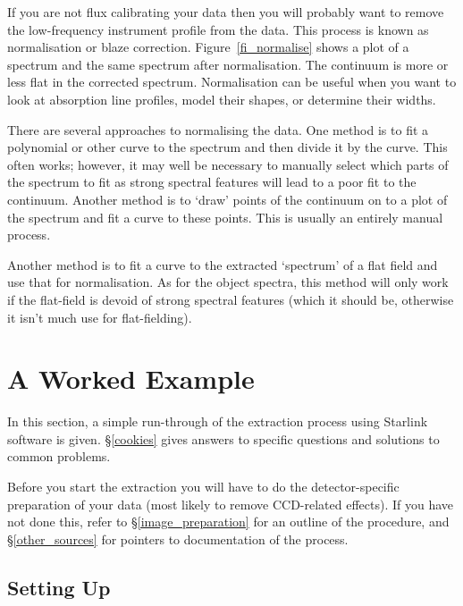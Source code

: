 \documentclass[twoside,11pt]{article}
\newcommand{\stardocinitials}  {SC}
\newcommand{\stardocnumber}    {7.2}
\newcommand{\stardocname}{\stardocinitials /\stardocnumber}
\newcommand{\htmlref}[2]{#1}
\newcommand{\xlabel}[1]{}
\newcommand{\mlabel}[1]{\xlabel{#1}\label{#1}}
\newcommand{\scspec}[2]{#1}
\newcommand{\scspec}[2]{#2}
\begin{document}
If you are not flux calibrating your data then you will probably want to
remove the low-frequency instrument profile from the data.  This process
is known as normalisation or blaze correction.
\scspec{Figure~\ref{fi_normalise}}{The figure above} shows a plot of
a spectrum and the same spectrum after normalisation.
The continuum is more or less flat in the corrected spectrum.
Normalisation can be useful when you want to look at absorption line
profiles, model their shapes, or determine their widths.

There are several approaches to normalising the data.
One method is to fit a polynomial or other curve to the
spectrum and then divide it by the curve.
This often works; however, it may well be necessary to manually
select which parts of the spectrum to fit as strong spectral
features will lead to a poor fit to the continuum.
Another method is to `draw' points of the continuum on to a plot
of the spectrum and fit a curve to these points.
This is usually an entirely manual process.

Another method is to fit a curve to the extracted `spectrum' of a
flat field and use that for normalisation.
As for the object spectra, this method will only work if the flat-field
is devoid of strong spectral features (which it should be, otherwise it
isn't much use for flat-fielding).


\section{\mlabel{simple_worked_example}A Worked Example}
\markboth{Example Reduction}{\stardocname}

In this section, a simple run-through of the extraction process using
Starlink software is given.
\scspec{\S\ref{cookies}}{The \htmlref{cookies}{cookies} section}
gives answers to specific questions and solutions to common problems.

Before you start the extraction you will have to do the
detector-specific preparation of your data (most likely to remove
CCD-related effects).
If you have not done this, refer to \scspec{\S\ref{image_preparation}}
{\htmlref{Image Preparation}{image_preparation}} for an outline of the
procedure, and \scspec{\S\ref{other_sources}}
{\htmlref{Other Sources of Information}{other_sources}} for pointers
to documentation of the process.


\subsection{Setting Up}
\end{document}

